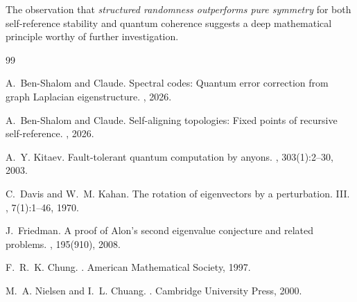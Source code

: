 \documentclass[11pt,a4paper]{article}
\theoremstyle{definition}
\begin{document}
The observation that \emph{structured randomness outperforms pure symmetry} for both self-reference stability and quantum coherence suggests a deep mathematical principle worthy of further investigation.


\begin{thebibliography}{99}

A.~Ben-Shalom and Claude.
\newblock Spectral codes: Quantum error correction from graph Laplacian eigenstructure.
, 2026.

A.~Ben-Shalom and Claude.
\newblock Self-aligning topologies: Fixed points of recursive self-reference.
, 2026.

A.~Y. Kitaev.
\newblock Fault-tolerant quantum computation by anyons.
, 303(1):2--30, 2003.

C.~Davis and W.~M. Kahan.
\newblock The rotation of eigenvectors by a perturbation. III.
, 7(1):1--46, 1970.

J.~Friedman.
\newblock A proof of Alon's second eigenvalue conjecture and related problems.
, 195(910), 2008.

F.~R.~K. Chung.
.
\newblock American Mathematical Society, 1997.

M.~A. Nielsen and I.~L. Chuang.
.
\newblock Cambridge University Press, 2000.

\end{thebibliography}
\end{document}

